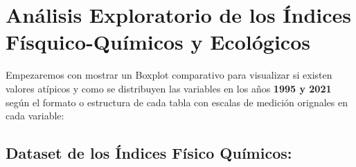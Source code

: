 \documentclass[
  10pt,
  letterpaper,
  DIV=11,
  numbers=noendperiod]{scrreprt}
\begin{document}
\hypertarget{anuxe1lisis-exploratorio-de-los-uxedndices-fuxedsquico-quuxedmicos-y-ecoluxf3gicos}{%
\chapter{Análisis Exploratorio de los Índices Físquico-Químicos y
Ecológicos}\label{anuxe1lisis-exploratorio-de-los-uxedndices-fuxedsquico-quuxedmicos-y-ecoluxf3gicos}}

Empezaremos con mostrar un Boxplot comparativo para visualizar si
existen valores atípicos y como se distribuyen las variables en los años
\textbf{1995 y 2021} según el formato o estructura de cada tabla con
escalas de medición orignales en cada variable:

\hypertarget{dataset-de-los-uxedndices-fuxedsico-quuxedmicos}{%
\section{Dataset de los Índices Físico
Químicos:}\label{dataset-de-los-uxedndices-fuxedsico-quuxedmicos}}
\end{document}
